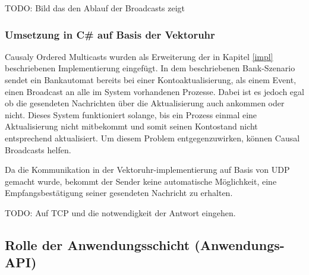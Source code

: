 TODO: Bild das den Ablauf der Broadcasts zeigt

\subsubsection{Umsetzung in C\# auf Basis der Vektoruhr}
Causaly Ordered Multicasts wurden als Erweiterung der in Kapitel \ref{impl} beschriebenen Implementierung eingefügt. In dem beschriebenen Bank-Szenario sendet ein Bankautomat bereits bei einer Kontoaktualisierung, als einem Event, einen Broadcast an alle im System vorhandenen Prozesse. Dabei ist es jedoch egal ob die gesendeten Nachrichten über die Aktualisierung auch ankommen oder nicht. Dieses System funktioniert solange, bis ein Prozess einmal eine Aktualisierung nicht mitbekommt und somit seinen Kontostand nicht entsprechend aktualisiert. Um diesem Problem entgegenzuwirken, können Causal Broadcasts helfen.

Da die Kommunikation in der Vektoruhr-implementierung auf Basis von UDP gemacht wurde, bekommt der Sender keine automatische Möglichkeit, eine Empfangsbestätigung seiner gesendeten Nachricht zu erhalten.

TODO: Auf TCP und die notwendigkeit der Antwort eingehen.

 
\subsection{Rolle der Anwendungsschicht (Anwendungs-API)}
